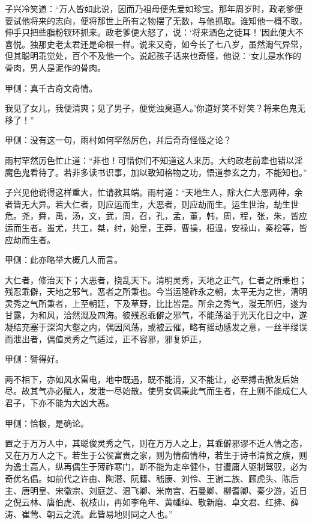 \begin{parag}
    子兴冷笑道：“万人皆如此说，因而乃祖母便先爱如珍宝。那年周岁时，政老爹便要试他将来的志向，便将那世上所有之物摆了无数，与他抓取。谁知他一概不取，伸手只把些脂粉钗环抓来。政老爹便大怒了，说：‘将来酒色之徒耳！’因此便大不喜悦。独那史老太君还是命根一样。说来又奇，如今长了七八岁，虽然淘气异常，但其聪明乖觉处，百个不及他一个。说起孩子话来也奇怪，他说：‘女儿是水作的骨肉，男人是泥作的骨肉。\begin{note}甲侧：真千古奇文奇情。\end{note}我见了女儿，我便清爽；见了男子，便觉浊臭逼人。’你道好笑不好笑？将来色鬼无移了！”\begin{note}甲侧：没有这一句，雨村如何罕然厉色，幷后奇奇怪怪之论？\end{note}雨村罕然厉色忙止道：“非也！可惜你们不知道这人来历。大约政老前辈也错以淫魔色鬼看待了。若非多读书识事，加以致知格物之功，悟道参玄之力，不能知也。”
\end{parag}


\begin{parag}
    子兴见他说得这样重大，忙请教其端。雨村道：“天地生人，除大仁大恶两种，余者皆无大异。若大仁者，则应运而生，大恶者，则应劫而生。运生世治，劫生世危。尧，舜，禹，汤，文，武，周，召，孔，孟，董，韩，周，程，张，朱，皆应运而生者。蚩尤，共工，桀，纣，始皇，王莽，曹操，桓温，安禄山，秦桧等，皆应劫而生者。\begin{note}甲侧：此亦略举大概几人而言。\end{note}大仁者，修治天下；大恶者，挠乱天下。清明灵秀，天地之正气，仁者之所秉也；残忍乖僻，天地之邪气，恶者之所秉也。今当运隆祚永之朝，太平无为之世，清明灵秀之气所秉者，上至朝廷，下及草野，比比皆是。所余之秀气，漫无所归，遂为甘露，为和风，洽然溉及四海。彼残忍乖僻之邪气，不能荡溢于光天化日之中，遂凝结充塞于深沟大壑之内，偶因风荡，或被云催，略有摇动感发之意，一丝半缕误而泄出者，偶值灵秀之气适过，正不容邪，邪复妒正，\begin{note}甲侧：譬得好。\end{note}两不相下，亦如风水雷电，地中既遇，既不能消，又不能让，必至搏击掀发后始尽。故其气亦必赋人，发泄一尽始散。使男女偶秉此气而生者，在上则不能成仁人君子，下亦不能为大凶大恶。\begin{note}甲侧：恰极，是确论。\end{note}置之于万万人中，其聪俊灵秀之气，则在万万人之上，其乖僻邪谬不近人情之态，又在万万人之下。若生于公侯富贵之家，则为情痴情种，若生于诗书清贫之族，则为逸士高人，纵再偶生于薄祚寒门，断不能为走卒健仆，甘遭庸人驱制驾驭，必为奇优名倡。如前代之许由、陶潜、阮籍、嵇康、刘伶、王谢二族、顾虎头、陈后主、唐明皇、宋徽宗、刘庭芝、温飞卿、米南宫、石曼卿、柳耆卿、秦少游，近日之倪云林、唐伯虎、祝枝山，再如李龟年、黄幡绰、敬新磨、卓文君、红拂、薛涛、崔莺、朝云之流。此皆易地则同之人也。”
\end{parag}


